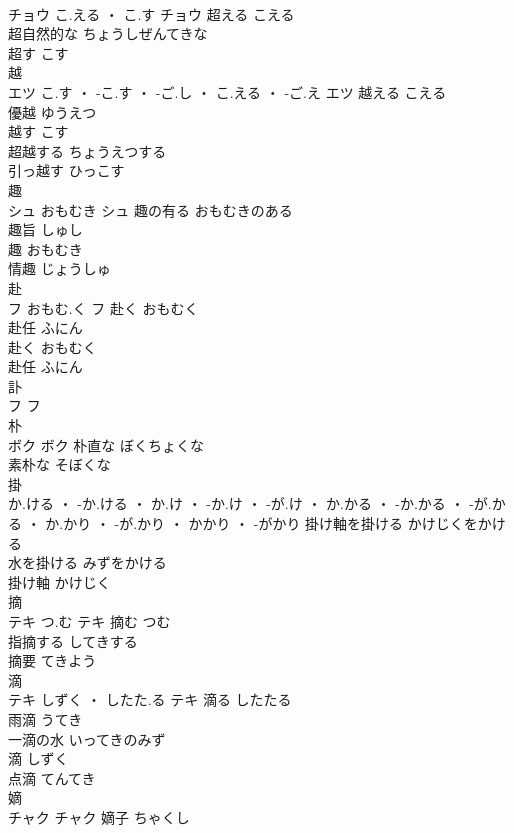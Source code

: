 \documentclass[8pt]{extreport}
\begin{document}
\begin{CJK}{UTF8}{min}
\\	チョウ	こ.える ・ こ.す	チョウ	超える	こえる	
\\	超自然的な	ちょうしぜんてきな	
\\	超す	こす	
\\	越	
\\	エツ	こ.す ・ -こ.す ・ -ご.し ・ こ.える ・ -ご.え	エツ	越える	こえる	
\\	優越	ゆうえつ	
\\	越す	こす	
\\	超越する	ちょうえつする	
\\	引っ越す	ひっこす	
\\	趣	
\\	シュ	おもむき	シュ	趣の有る	おもむきのある	
\\	趣旨	しゅし	
\\	趣	おもむき	
\\	情趣	じょうしゅ	
\\	赴	
\\	フ	おもむ.く	フ	赴く	おもむく	
\\	赴任	ふにん	
\\	赴く	おもむく	
\\	赴任	ふにん	
\\	訃	
\\	フ		フ																																			
\\	朴	
\\	ボク		ボク	朴直な	ぼくちょくな	
\\	素朴な	そぼくな	
\\	掛	
\\	か.ける ・ -か.ける ・ か.け ・ -か.け ・ -が.け ・ か.かる ・ -か.かる ・ -が.かる ・ か.かり ・ -が.かり ・ かかり ・ -がかり		掛け軸を掛ける	かけじくをかける	
\\	水を掛ける	みずをかける	
\\	掛け軸	かけじく	
\\	摘	
\\	テキ	つ.む	テキ	摘む	つむ	
\\	指摘する	してきする	
\\	摘要	てきよう	
\\	滴	
\\	テキ	しずく ・ したた.る	テキ	滴る	したたる	
\\	雨滴	うてき	
\\	一滴の水	いってきのみず	
\\	滴	しずく	
\\	点滴	てんてき	
\\	嫡	
\\	チャク		チャク	嫡子	ちゃくし	

\end{CJK}
\end{document}
